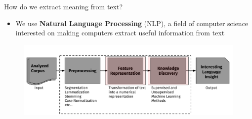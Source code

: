 \documentclass[10pt,xcolor=table]{beamer}
\begin{document}
\begin{frame}{How do we extract meaning from text?}

\begin{itemize}
\item[] {{We use \textbf{Natural Language Processing} (NLP), a field of computer science interested on making computers extract useful information from text}}
\end{itemize}
\begin{figure}
\centering
\includegraphics[width=1\linewidth]{image2/Chapitre1/nlp_flow2}
\end{figure}
\vspace{\textheight}
\end{frame}
\end{document}
